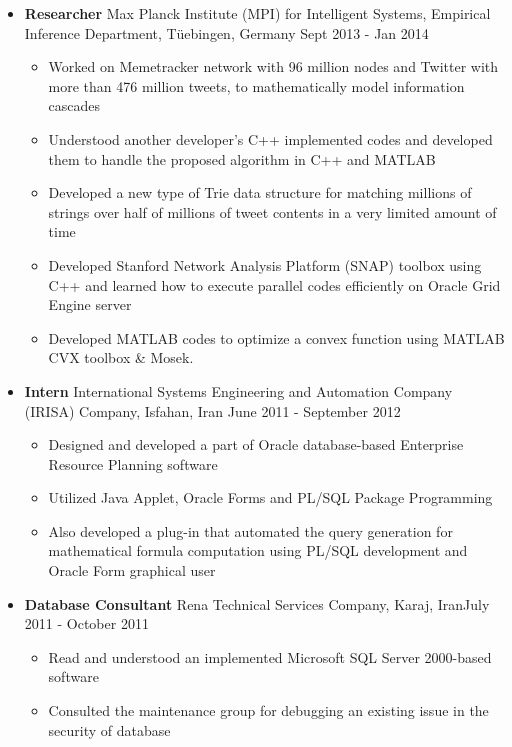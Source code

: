 \documentclass[letter]{res}
\begin{document}
\begin{resume}
\begin{itemize}[leftmargin=-.1in]
			\item \textbf{Researcher} \newline
			Max Planck Institute (MPI) for Intelligent Systems, Empirical Inference Department, Tüebingen, Germany \hfill {\footnotesize Sept 2013 - Jan 2014}\\
			\vspace{-4mm}
			\iflong
			\begin{itemize}
				\item Worked on Memetracker network with 96 million nodes and Twitter with more than 476 million tweets, to mathematically model information cascades
				\item Understood another developer's C++ implemented codes and developed them to handle the proposed algorithm in C++ and MATLAB
				\item Developed a new type of Trie data structure for matching millions of strings over half of millions of tweet contents in a very limited amount of time
				\item Developed Stanford Network Analysis Platform (SNAP) toolbox using C++ and learned how to execute parallel codes efficiently on Oracle Grid Engine server
				\item Developed MATLAB codes to optimize a convex function using MATLAB CVX toolbox \& Mosek.
			\end{itemize}
			\fi
			
			\item \textbf{Intern} \newline
			International Systems Engineering and Automation Company (IRISA) Company, Isfahan, Iran \hfill June 2011 - September 2012\\
			\vspace{-4mm}
			\iflong
			\begin{itemize}
				\item Designed and developed a part of Oracle database-based Enterprise Resource Planning software
				\item Utilized Java Applet, Oracle Forms and PL/SQL Package Programming
				\item Also developed a plug-in that automated the query generation for mathematical formula computation using PL/SQL development and Oracle Form graphical user
			\end{itemize}
			\fi
			
			\item \textbf{Database Consultant}
			\newline
			Rena Technical Services Company, Karaj, Iran\hfill July 2011 - October 2011\\
			\vspace{-4mm}
			\iflong
			\begin{itemize}
				\item Read and understood an implemented Microsoft SQL Server 2000-based software
				\item Consulted the maintenance group for debugging an existing issue in the security of database
			\end{itemize}
		\end{itemize}
		

\end{resume}
\end{document}
